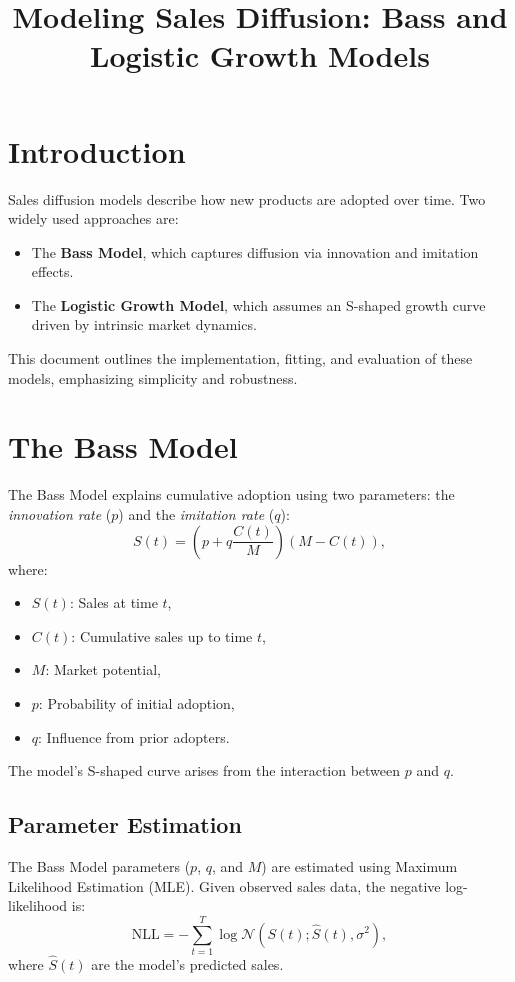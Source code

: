 \documentclass[12pt]{article}
\title{Modeling Sales Diffusion: Bass and Logistic Growth Models}
\author{}
\date{}
\begin{document}
\maketitle

\section{Introduction}
Sales diffusion models describe how new products are adopted over time. Two widely used approaches are:
\begin{itemize}
    \item The \textbf{Bass Model}, which captures diffusion via innovation and imitation effects.
    \item The \textbf{Logistic Growth Model}, which assumes an S-shaped growth curve driven by intrinsic market dynamics.
\end{itemize}
This document outlines the implementation, fitting, and evaluation of these models, emphasizing simplicity and robustness.

\section{The Bass Model}
The Bass Model explains cumulative adoption using two parameters: the \textit{innovation rate} (\(p\)) and the \textit{imitation rate} (\(q\)):
\[
S(t) = \left( p + q \frac{C(t)}{M} \right) \left( M - C(t) \right),
\]
where:
\begin{itemize}
    \item \(S(t)\): Sales at time \(t\),
    \item \(C(t)\): Cumulative sales up to time \(t\),
    \item \(M\): Market potential,
    \item \(p\): Probability of initial adoption,
    \item \(q\): Influence from prior adopters.
\end{itemize}
The model's S-shaped curve arises from the interaction between \(p\) and \(q\).

\subsection{Parameter Estimation}
The Bass Model parameters (\(p\), \(q\), and \(M\)) are estimated using Maximum Likelihood Estimation (MLE). Given observed sales data, the negative log-likelihood is:
\[
\text{NLL} = -\sum_{t=1}^T \log \mathcal{N}(S(t); \hat{S}(t), \sigma^2),
\]
where \(\hat{S}(t)\) are the model's predicted sales.
\end{document}
